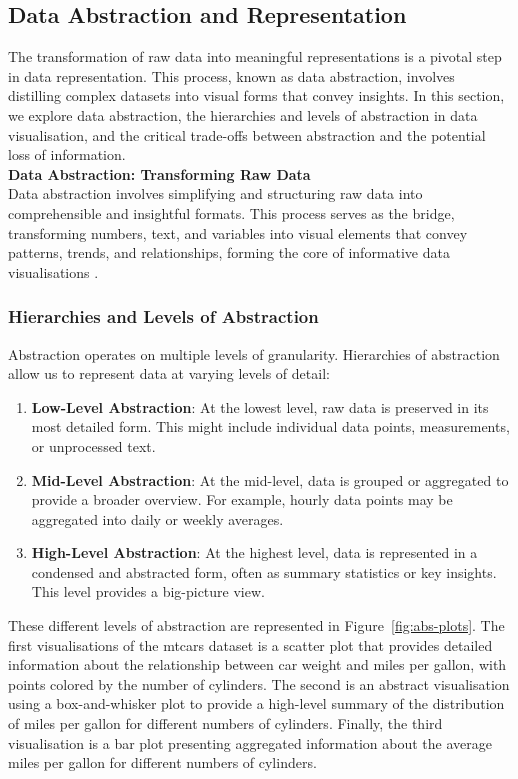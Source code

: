 \documentclass{article}\usepackage[]{graphicx}\usepackage[]{xcolor}
\numberwithin{equation}{section}
\begin{document}
\subsection{Data Abstraction and Representation}
The transformation of raw data into meaningful representations is a pivotal step in data representation. This process, known as data abstraction, involves distilling complex datasets into visual forms that convey insights. In this section, we explore data abstraction, the hierarchies and levels of abstraction in data visualisation, and the critical trade-offs between abstraction and the potential loss of information.\\

\noindent \textbf{Data Abstraction: Transforming Raw Data}\\
Data abstraction involves simplifying and structuring raw data into comprehensible and insightful formats. This process serves as the bridge, transforming numbers, text, and variables into visual elements that convey patterns, trends, and relationships, forming the core of informative data visualisations \cite{tufte2001visual}.

\subsubsection{Hierarchies and Levels of Abstraction}
Abstraction operates on multiple levels of granularity. Hierarchies of abstraction allow us to represent data at varying levels of detail: 
\begin{enumerate}
    \item \textbf{Low-Level Abstraction}: At the lowest level, raw data is preserved in its most detailed form. This might include individual data points, measurements, or unprocessed text.
    \item \textbf{Mid-Level Abstraction}: At the mid-level, data is grouped or aggregated to provide a broader overview. For example, hourly data points may be aggregated into daily or weekly averages.
    \item \textbf{High-Level Abstraction}: At the highest level, data is represented in a condensed and abstracted form, often as summary statistics or key insights. This level provides a big-picture view.
\end{enumerate}

\noindent 
These different levels of abstraction are represented in Figure~\ref{fig:abs-plots}. The first visualisations of the mtcars dataset is a scatter plot that provides detailed information about the relationship between car weight and miles per gallon, with points colored by the number of cylinders. The second is an abstract visualisation using a box-and-whisker plot to provide a high-level summary of the distribution of miles per gallon for different numbers of cylinders. Finally, the third visualisation is a bar plot presenting aggregated information about the average miles per gallon for different numbers of cylinders.
\end{document}
